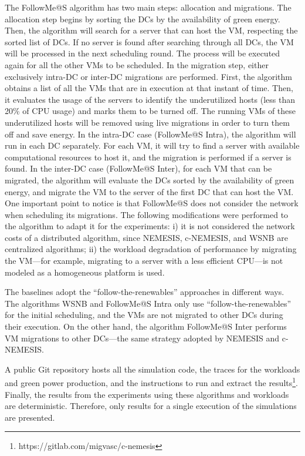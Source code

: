 The FollowMe@S algorithm has two main steps: allocation and migrations. The allocation step begins by sorting the DCs by the availability of green energy. Then, the algorithm will search for a server that can host the VM, respecting the sorted list of DCs. If no server is found after searching through all DCs, the VM will be processed in the next scheduling round. The process will be executed again for all the other VMs to be scheduled. In the migration step, either exclusively intra-DC or inter-DC migrations are performed. First, the algorithm obtains a list of all the VMs that are in execution at that instant of time. Then, it evaluates the usage of the servers to identify the underutilized hosts (less than 20\% of CPU usage) and marks them to be turned off. The running VMs of these underutilized hosts will be removed using live migrations in order to turn them off and save energy. In the intra-DC case (FollowMe@S Intra), the algorithm will run in each DC separately. For each VM, it will try to find a server with available computational resources to host it, and the migration is performed if a server is found. In the inter-DC case (FollowMe@S Inter), for each VM that can be migrated, the algorithm will evaluate the DCs sorted by the availability of green energy, and migrate the VM to the server of the first DC that can host the VM. One important point to notice is that FollowMe@S does not consider the network when scheduling its migrations. The following modifications were performed to the algorithm to adapt it for the experiments: i) it is not considered the network costs of a distributed algorithm, since NEMESIS, c-NEMESIS, and WSNB are centralized algorithms; ii) the workload degradation of performance by migrating the VM---for example, migrating to a server with a less efficient CPU---is not modeled as a homogeneous platform is used.

The baselines adopt the ``follow-the-renewables'' approaches in different ways. The algorithms WSNB and FollowMe@S Intra only use ``follow-the-renewables'' for the initial scheduling, and the VMs are not migrated to other DCs during their execution. On the other hand, the algorithm FollowMe@S Inter performs VM migrations to other DCs---the same strategy adopted by NEMESIS and c-NEMESIS.


A public Git repository hosts all the simulation code, the traces for the workloads and green power production, and the instructions to run and extract the results\footnote{https://gitlab.com/migvasc/c-nemesis}. Finally, the results from the experiments using these algorithms and workloads are deterministic. Therefore, only results for a single execution of the simulations are presented.

